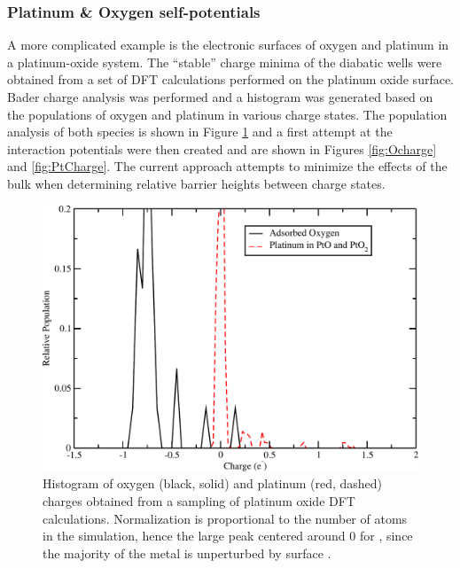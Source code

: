 \subsubsection{Platinum \& Oxygen self-potentials}
A more complicated example is the electronic surfaces
of oxygen and platinum in a platinum-oxide system.  The ``stable'' charge minima of the diabatic wells
were obtained from a set of DFT calculations performed on
the platinum oxide surface. Bader charge analysis was performed and a histogram
was generated based on the populations of oxygen and platinum in various charge
states. The population analysis of both species is shown in Figure
\ref{fig:population} and a first attempt at the interaction potentials were
then created and are shown in Figures \ref{fig:Ocharge} and \ref{fig:PtCharge}.
The current approach attempts to minimize the effects of the bulk  when
determining relative barrier heights between charge states.

\begin{figure}
  \centering
  \includegraphics[width=0.75\linewidth]{../figures/chap5/chgDist_PtO.pdf}
  \caption{Histogram of oxygen (black, solid) and platinum (red, dashed)
charges obtained from a sampling of platinum oxide DFT calculations.
Normalization is proportional to the number of atoms in the simulation, hence the
large peak centered around 0 for , since the majority of the metal is
unperturbed by surface .}
\label{fig:population}
\end{figure}


